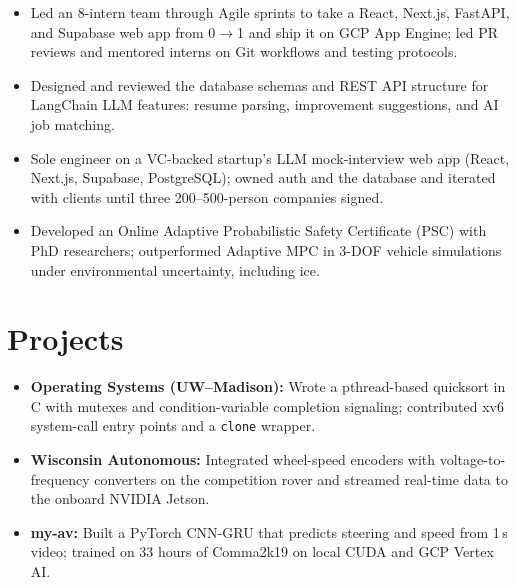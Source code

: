 \documentclass[11pt, letterpaper]{article}
\begin{document}
\begin{itemize}
  \item Led an 8-intern team through Agile sprints to take a React, Next.js, FastAPI, and Supabase web app from 0$\to$1 and ship it on GCP App Engine; led PR reviews and mentored interns on Git workflows and testing protocols.
  \item Designed and reviewed the database schemas and REST API structure for LangChain LLM features: resume parsing, improvement suggestions, and AI job matching.
\end{itemize}

\begin{itemize}
  \item Sole engineer on a VC-backed startup's LLM mock-interview web app (React, Next.js, Supabase, PostgreSQL); owned auth and the database and iterated with clients until three 200--500-person companies signed.
\end{itemize}

\begin{itemize}
  \item Developed an Online Adaptive Probabilistic Safety Certificate (PSC) with PhD researchers; outperformed Adaptive MPC in 3-DOF vehicle simulations under environmental uncertainty, including ice.
\end{itemize}

\section{Projects}
\begin{itemize}
  \item \textbf{Operating Systems (UW--Madison):} Wrote a pthread-based quicksort in C with mutexes and condition-variable completion signaling; contributed xv6 system-call entry points and a \texttt{clone} wrapper.
  \item \textbf{Wisconsin Autonomous:} Integrated wheel-speed encoders with voltage-to-frequency converters on the competition rover and streamed real-time data to the onboard NVIDIA Jetson.
  \item \textbf{my-av:} Built a PyTorch CNN-GRU that predicts steering and speed from 1\,s video; trained on 33 hours of Comma2k19 on local CUDA and GCP Vertex AI.
\end{itemize}
\end{document}
